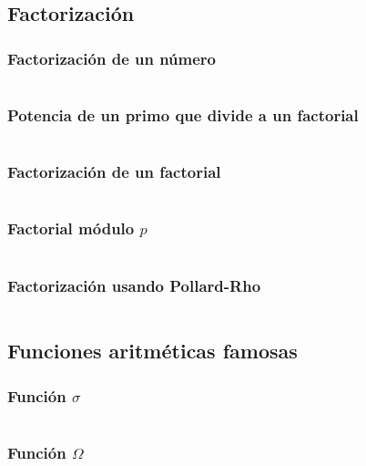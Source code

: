 \documentclass[11pt]{article}
\begin{document}
		
		\subsection{Factorización}
			\subsubsection{Factorización de un número}
			\inputminted[tabsize=2,breaklines,firstline=194,lastline=207,fontsize=\small]{c++}{numberTheory.cpp}
			
			\subsubsection{Potencia de un primo que divide a un factorial}
			\inputminted[tabsize=2,breaklines,firstline=418,lastline=422,fontsize=\small]{c++}{numberTheory.cpp}
			
			\subsubsection{Factorización de un factorial}
			\inputminted[tabsize=2,breaklines,firstline=424,lastline=431,fontsize=\small]{c++}{numberTheory.cpp}
			
			\subsubsection{Factorial módulo $p$}
			\inputminted[tabsize=2,breaklines,firstline=1024,lastline=1039,fontsize=\small]{c++}{numberTheory.cpp}
			
			\subsubsection{Factorización usando Pollard-Rho}
			\inputminted[tabsize=2,breaklines,firstline=657,lastline=709,fontsize=\small]{c++}{numberTheory.cpp}
		
		\subsection{Funciones aritméticas famosas}
			\subsubsection{Función $\sigma$}
			\inputminted[tabsize=2,breaklines,firstline=209,lastline=226,fontsize=\small]{c++}{numberTheory.cpp}
			
			\subsubsection{Función $\Omega$}
			\inputminted[tabsize=2,breaklines,firstline=228,lastline=235,fontsize=\small]{c++}{numberTheory.cpp}
			
\end{document}
